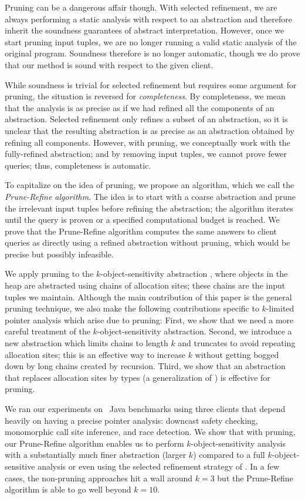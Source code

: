 Pruning can be a dangerous affair though.  With selected refinement,
we are always performing a static analysis with respect to an abstraction
and therefore inherit the soundness guarantees of abstract interpretation.
However, once we start pruning input tuples, we are no longer running a valid
static analysis of the original program.  Soundness therefore is no longer automatic,
though we do prove that our method is sound with respect to the given client.

While soundness is trivial for selected refinement but requires some
argument for pruning, the situation is reversed for {\em completeness}.  By
completeness, we mean that the analysis is as precise as
if we had refined all the components of an abstraction.  Selected
refinement only refines a subset of an abstraction, so it is unclear
that the resulting abstraction is as precise as an abstraction obtained by
refining all components.  However, with pruning, we conceptually work with the
fully-refined abstraction; and by removing input tuples, we cannot prove fewer
queries; thus, completeness is automatic.

To capitalize on the idea of pruning, we propose an algorithm, which we
call the {\em Prune-Refine algorithm}.  The idea is to start with a coarse abstraction
and prune the irrelevant input tuples before refining the abstraction; the
algorithm iterates until the query is proven or a specified computational budget
is reached.  We prove that the Prune-Refine algorithm computes the same answers to client queries
as directly using a refined abstraction without pruning, which would be precise
but possibly infeasible.

We apply pruning to the $k$-object-sensitivity abstraction
\cite{kobj}, where objects in the heap are abstracted using chains of
allocation sites; these chains are the input tuples we maintain.
Although the main contribution of this paper is the general
pruning technique, we also make the following contributions specific to
$k$-limited pointer analysis which arise due to pruning: First, we show
that we need a more careful treatment of the $k$-object-sensitivity abstraction.
Second, we introduce a new abstraction which limits
chains to length $k$ and truncates to avoid repeating
allocation sites; this is an effective way to increase $k$ without getting bogged down by long chains created by recursion.
Third, we show that an abstraction that
replaces allocation sites by types (a generalization of
\cite{smaragdakis11context}) is effective for pruning.

We ran our experiments on \numBenchmarks\ Java benchmarks using three clients that
depend heavily on having a precise pointer analysis: downcast safety
checking, monomorphic call site inference, and race detection.
We show that with pruning, our Prune-Refine algorithm enables us to perform $k$-object-sensitivity
analysis with a substantially much finer abstraction (larger $k$)
compared to a full $k$-object-sensitive analysis or even using the selected
refinement strategy of \cite{liang11minimal}.
In a few cases, the non-pruning approaches hit a wall around $k=3$ but the Prune-Refine
algorithm is able to go well beyond $k=10$.
